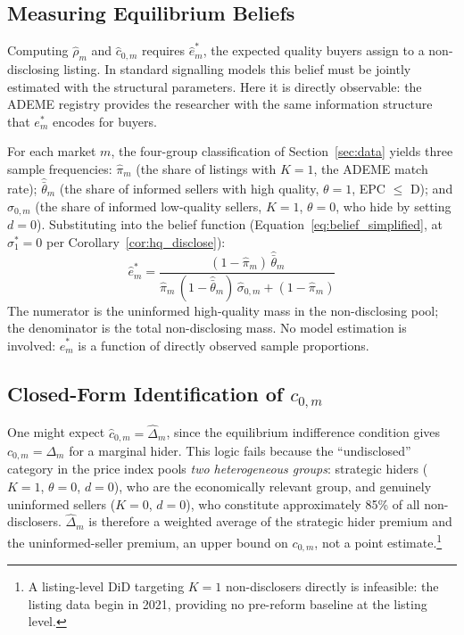\documentclass[10pt,letterpaper]{bp-template-concise}
\begin{document}
\subsection{Measuring Equilibrium Beliefs}
\label{sec:beliefs}

Computing $\hat\rho_m$ and $\hat{c}_{0,m}$ requires $\hat{e}^*_m$, the expected quality buyers assign to a non-disclosing listing. In standard signalling models this belief must be jointly estimated with the structural parameters. Here it is directly observable: the ADEME registry provides the researcher with the same information structure that $e^*_m$ encodes for buyers.

For each market $m$, the four-group classification of Section~\ref{sec:data} yields three sample frequencies: $\hat\pi_m$ (the share of listings with $K=1$, the ADEME match rate); $\hat{\bar\theta}_m$ (the share of informed sellers with high quality, $\theta=1$, EPC $\leq$ D); and $\hat\sigma_{0,m}$ (the share of informed low-quality sellers, $K=1$, $\theta=0$, who hide by setting $d=0$). Substituting into the belief function (Equation~\eqref{eq:belief_simplified}, at $\sigma_1^*=0$ per Corollary~\ref{cor:hq_disclose}):
\begin{equation}
    \hat{e}^*_m = \frac{(1-\hat\pi_m)\,\hat{\bar\theta}_m}{\hat\pi_m\,(1-\hat{\bar\theta}_m)\,\hat\sigma_{0,m} + (1-\hat\pi_m)}
    \label{eq:estar}
\end{equation}
The numerator is the uninformed high-quality mass in the non-disclosing pool; the denominator is the total non-disclosing mass. No model estimation is involved: $\hat{e}^*_m$ is a function of directly observed sample proportions.

\subsection{Closed-Form Identification of $c_{0,m}$}

One might expect $\hat{c}_{0,m} = \hat\Delta_m$, since the equilibrium indifference condition gives $c_{0,m} = \Delta_m$ for a marginal hider. This logic fails because the ``undisclosed'' category in the price index pools \emph{two heterogeneous groups}: strategic hiders ($K=1$, $\theta=0$, $d=0$), who are the economically relevant group, and genuinely uninformed sellers ($K=0$, $d=0$), who constitute approximately 85\% of all non-disclosers. $\hat\Delta_m$ is therefore a weighted average of the strategic hider premium and the uninformed-seller premium, an upper bound on $c_{0,m}$, not a point estimate.\footnote{A listing-level DiD targeting $K=1$ non-disclosers directly is infeasible: the listing data begin in 2021, providing no pre-reform baseline at the listing level.}
\end{document}
